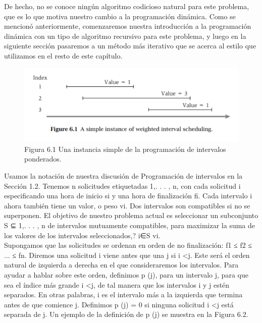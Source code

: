 \documentclass[a4paper]{article}
\begin{document}
De hecho, no se conoce ningún algoritmo codicioso natural para este problema, que es lo que motiva nuestro cambio a la programación dinámica. Como se mencionó anteriormente, comenzaremos nuestra introducción a la programación dinámica con un tipo de algoritmo recursivo para este problema, y luego en la siguiente sección pasaremos a un método más iterativo que se acerca al estilo que utilizamos en el resto de este capítulo.\\

\begin{figure}[h]
\centering
\includegraphics[scale=1]{Imagenes-Seccion6/fig6_1.PNG}
\caption{Figura 6.1 Una instancia simple de la programación de intervalos ponderados.}
\end{figure}

Usamos la notación de nuestra discusión de Programación de intervalos en la Sección 1.2. Tenemos n solicitudes etiquetadas 1,. . . , n, con cada solicitud i especificando una hora de inicio si y una hora de finalización fi. Cada intervalo i ahora también tiene un valor, o peso vi. Dos intervalos son compatibles si no se superponen. El objetivo de nuestro problema actual es seleccionar un subconjunto S ⊆ {1,. . . , n} de intervalos mutuamente compatibles, para maximizar la suma de los valores de los intervalos seleccionados,? i∈S vi.\\

Supongamos que las solicitudes se ordenan en orden de no finalización: f1 ≤ f2 ≤ ... ≤ fn. Diremos una solicitud i viene antes que una j si i <j. Este será el orden natural de izquierda a derecha en el que consideraremos los intervalos. Para ayudar a hablar sobre este orden, definimos p (j), para un intervalo j, para que sea el índice más grande i <j, de tal manera que los intervalos i y j estén separados. En otras palabras, i es el intervalo más a la izquierda que termina antes de que comience j. Definimos p (j) = 0 si ninguna solicitud i <j está separada de j. Un ejemplo de la definición de p (j) se muestra en la Figura 6.2.\\
\end{document}
